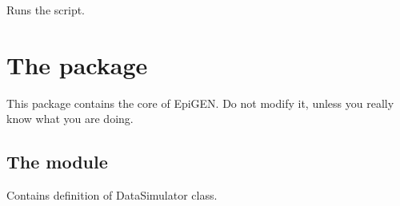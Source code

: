 \documentclass[a4paper,10pt,english]{sphinxhowto}
\begin{document}
\begin{fulllineitems}
\label{\detokenize{merge_genotype_corpora:merge_genotype_corpora.run_script}}
Runs the script.

\end{fulllineitems}



\section{The package }
\label{\detokenize{utils:the-package-utils}}\label{\detokenize{utils::doc}}
This package contains the core of EpiGEN. Do not modify it, unless you really know what you are doing.


\subsection{The module }
\label{\detokenize{utils:module-utils.data_simulator}}\label{\detokenize{utils:the-module-utils-data-simulator-py}}
Contains definition of DataSimulator class.
\end{document}
